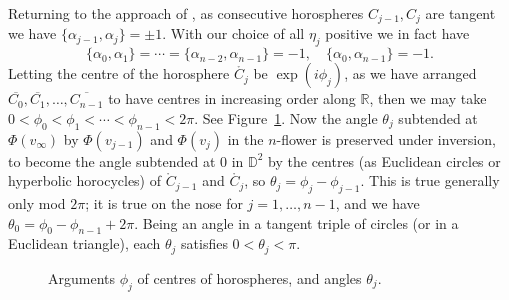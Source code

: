 \documentclass[12pt]{amsart}
\numberwithin{equation}{section}
\theoremstyle{named}
\newcommand{\reffig}[1]{Figure~\ref{Fig:#1}}
\newcommand{\R}{\mathbb{R}}
\begin{document}
Returning to the approach of \cite{MZ25}, as consecutive horospheres $C_{j-1}, C_j$ are tangent we have $\{\alpha_{j-1}, \alpha_j\} = \pm 1$. With our choice of all $\eta_j$ positive we in fact have \cite[lemma 4.2]{MZ25}
\[
\{\alpha_0, \alpha_1 \} = \cdots = \{\alpha_{n-2}, \alpha_{n-1}\} = -1, \quad
\{ \alpha_0, \alpha_{n-1} \} = -1.
\]
Letting the centre of the horosphere $\mathring{C_j}$ be $\exp(i \phi_j)$, as we have arranged $\overline{C_0}, \overline{C_1}, \ldots, \overline{C_{n-1}}$ to have centres in increasing order along $\R$, then we may take $0 < \phi_0 < \phi_1 < \cdots < \phi_{n-1} < 2\pi$. See \reffig{arguments_angles}. Now the angle $\theta_j$ subtended at $\Phi(v_\infty)$ by $\Phi(v_{j-1})$ and $\Phi(v_j)$ in the $n$-flower is preserved under inversion, to become the angle subtended at $0$ in $\mathbb{D}^2$ by the centres (as Euclidean circles or hyperbolic horocycles) of $\mathring{C}_{j-1}$ and $\mathring{C_j}$, so $\theta_j = \phi_j - \phi_{j-1}$. This is true generally only mod $2\pi$; it is true on the nose for $j=1, \ldots, n-1$, and we have $\theta_0 = \phi_0 - \phi_{n-1} + 2\pi$. Being an angle in a tangent triple of circles (or in a Euclidean triangle), each $\theta_j$ satisfies $0 < \theta_j < \pi$.

\begin{figure}
\begin{center}
\end{center}
 \caption{Arguments $\phi_j$ of centres of horospheres, and angles $\theta_j$.}
 \label{Fig:arguments_angles}
\end{figure}
\end{document}
